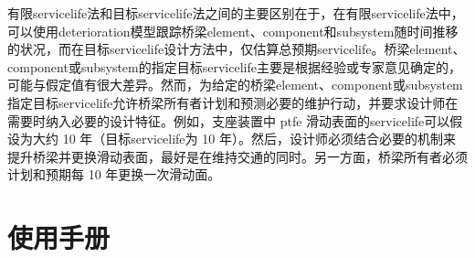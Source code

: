 有限\gls*{servicelife}法和目标\gls*{servicelife}法之间的主要区别在于，在有限\gls*{servicelife}法中，可以使用\gls*{deterioration}模型跟踪桥梁\gls*{element}、\gls*{component}和\gls*{subsystem}随时间推移的状况，而在目标\gls*{servicelife}设计方法中，仅估算总预期\gls*{servicelife}。桥梁\gls*{element}、\gls*{component}或\gls*{subsystem}的指定目标\gls*{servicelife}主要是根据经验或专家意见确定的，可能与假定值有很大差异。然而，为给定的桥梁\gls*{element}、\gls*{component}或\gls*{subsystem}指定目标\gls*{servicelife}允许桥梁所有者计划和预测必要的维护行动，并要求设计师在需要时纳入必要的设计特征。例如，支座装置中 \acrlong{ptfe} 滑动表面的\gls*{servicelife}可以假设为大约 10 年（目标\gls*{servicelife}为 10 年）。然后，设计师必须结合必要的机制来提升桥梁并更换滑动表面，最好是在维持交通的同时。另一方面，桥梁所有者必须计划和预期每 10 年更换一次滑动面。

\section{使用手册}


